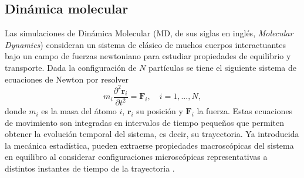 \subsection{Dinámica molecular}

Las simulaciones de Dinámica Molecular (MD, de sus siglas en inglés, 
\textit{Molecular Dynamics}) consideran un sistema de clásico de muchos cuerpos 
interactuantes bajo un campo de fuerzas newtoniano para estudiar propiedades de 
equilibrio y transporte. Dada la configuración de $N$ partículas se tiene el 
siguiente sistema de ecuaciones de Newton por resolver
\begin{equation}
    m_i \frac{\partial^2 \mathbf{r}_i}{\partial t^2} = \mathbf{F}_i, \quad i = 1,..., N,
\end{equation}
donde $m_i$ es la masa del átomo $i$, $\mathbf{r}_i$ su posición y $\mathbf{F}_i$
la fuerza. Estas ecuaciones de movimiento son integradas en intervalos de tiempo
pequeños que permiten obtener la evolución temporal del sistema, es decir, su
trayectoria. Ya introducida la mecánica estadística, pueden extraerse propiedades
macroscópicas del sistema en equilibro al considerar configuraciones microscópicas
representativas a distintos instantes de tiempo de la trayectoria
\cite{allen2017, frenkel2001}.

